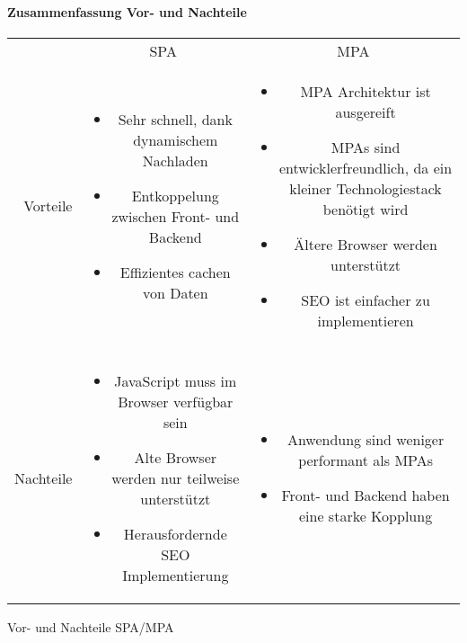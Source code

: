 \paragraph{Zusammenfassung Vor- und Nachteile} \label{para:Zusammenfassung_Vor-_und_Nachteile}
\mbox{} %
\begin{center}
	\begin{tabular}{rcc}
		& SPA & MPA \\
		Vorteile &
		\begin{minipage}[t]{0.4\textwidth}
			\begin{itemize}
				\item Sehr schnell, dank dynamischem Nachladen
				\item Entkoppelung zwischen Front- und Backend
				\item Effizientes cachen von Daten
			\end{itemize}
		\end{minipage} &
		\begin{minipage}[t]{0.4\textwidth}
			\begin{itemize}
				\item MPA Architektur ist ausgereift
				\item MPAs sind entwicklerfreundlich, da ein kleiner Technologiestack benötigt wird
				\item Ältere Browser werden unterstützt
				\item SEO ist einfacher zu implementieren
			\end{itemize}
		\end{minipage}\\
		& & \\ %
		Nachteile &
		\begin{minipage}[t]{0.4\textwidth}
			\begin{itemize}
				\item JavaScript muss im Browser verfügbar sein
				\item Alte Browser werden nur teilweise unterstützt
				\item Herausfordernde SEO Implementierung
			\end{itemize}
		\end{minipage} &
		\begin{minipage}[t]{0.4\textwidth}
			\begin{itemize}
				\item Anwendung sind weniger performant als MPAs
				\item Front- und Backend haben eine starke Kopplung
			\end{itemize}
		\end{minipage}
	\end{tabular}
\caption{Vor- und Nachteile SPA/MPA}
\label{tab:Vor-_und_Nachteile_SPA/MPA}
\end{center}

